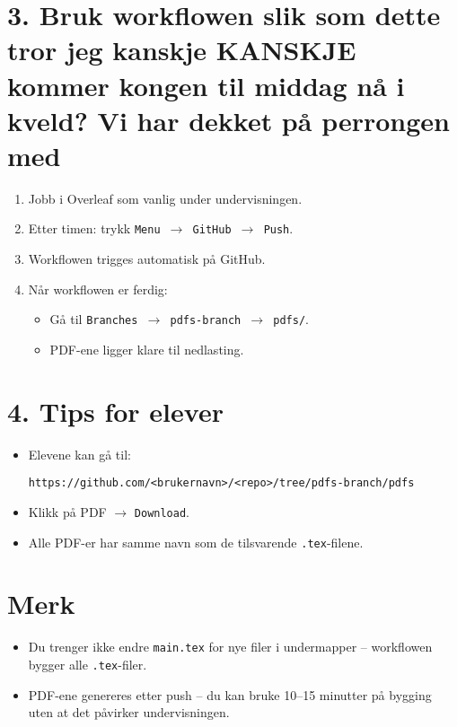 \documentclass[a4paper,12pt]{article}
\begin{document}
\section*{3. Bruk workflowen slik som dette tror jeg kanskje KANSKJE kommer kongen til middag nå i kveld? Vi har dekket på perrongen med}
\begin{enumerate}[label=\arabic*.]
    \item Jobb i Overleaf som vanlig under undervisningen.
    \item Etter timen: trykk \texttt{Menu $\to$ GitHub $\to$ Push}.
    \item Workflowen trigges automatisk på GitHub.
    \item Når workflowen er ferdig:
    \begin{itemize}
        \item Gå til \texttt{Branches $\to$ pdfs-branch $\to$ pdfs/}.
        \item PDF-ene ligger klare til nedlasting.
    \end{itemize}
\end{enumerate}

\section*{4. Tips for elever}
\begin{itemize}
    \item Elevene kan gå til:
    \begin{verbatim}
https://github.com/<brukernavn>/<repo>/tree/pdfs-branch/pdfs
    \end{verbatim}
    \item Klikk på PDF $\to$ \texttt{Download}.
    \item Alle PDF-er har samme navn som de tilsvarende \texttt{.tex}-filene.
\end{itemize}

\section*{Merk}
\begin{itemize}
    \item Du trenger ikke endre \texttt{main.tex} for nye filer i undermapper – workflowen bygger alle \texttt{.tex}-filer.
    \item PDF-ene genereres etter push – du kan bruke 10--15 minutter på bygging uten at det påvirker undervisningen.
\end{itemize}
\end{document}
